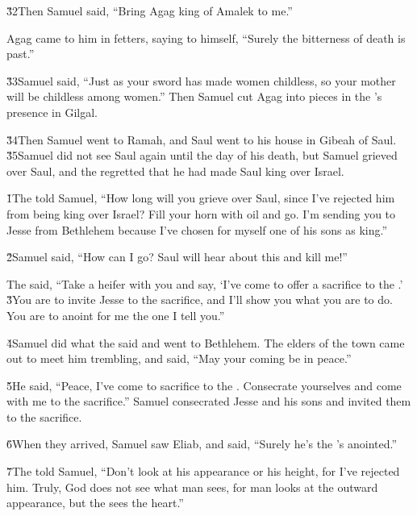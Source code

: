 \v{32}Then Samuel said, ``Bring Agag king of Amalek to me.''

Agag came to him in fetters, saying to himself, ``Surely the bitterness of death is past.''

\v{33}Samuel said, ``Just as your sword has made women childless, so your mother will be childless among women.'' Then Samuel cut Agag into pieces in the 's presence in Gilgal.

\v{34}Then Samuel went to Ramah, and Saul went to his house in Gibeah of Saul. \v{35}Samuel did not see Saul again until the day of his death, but Samuel grieved over Saul, and the  regretted that he had made Saul king over Israel.

\v{1}The  told Samuel, ``How long will you grieve over Saul, since I've rejected him from being king over Israel? Fill your horn with oil and go. I'm sending you to Jesse from Bethlehem because I've chosen for myself one of his sons as king.''

\v{2}Samuel said, ``How can I go? Saul will hear about this and kill me!''

The  said, ``Take a heifer with you and say, `I've come to offer a sacrifice to the .' \v{3}You are to invite Jesse to the sacrifice, and I'll show you what you are to do. You are to anoint for me the one I tell you.''

\v{4}Samuel did what the  said and went to Bethlehem. The elders of the town came out to meet him trembling, and said, ``May your coming be in peace.''

\v{5}He said, ``Peace, I've come to sacrifice to the . Consecrate yourselves and come with me to the sacrifice.'' Samuel consecrated Jesse and his sons and invited them to the sacrifice.

\v{6}When they arrived, Samuel saw Eliab, and said, ``Surely he's the 's anointed.''

\v{7}The  told Samuel, ``Don't look at his appearance or his height, for I've rejected him. Truly, God does not see what man sees, for man looks at the outward appearance, but the  sees the heart.''

